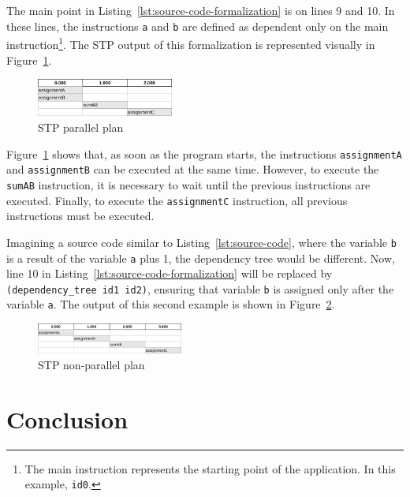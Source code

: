 \documentclass[letterpaper]{article}
\begin{document}
The main point in Listing~\ref{lst:source-code-formalization} is on lines 9 and 10. In these lines, the instructions \texttt{a} and \texttt{b} are defined as dependent only on the main instruction\footnote{The main instruction represents the starting point of the application. In this example, \texttt{id0}.}. The STP output of this formalization is represented visually in Figure~\ref{fig:parallel-plan}.

\begin{figure}[h]
    \centering
    \includegraphics[width=0.4\textwidth]{./images/parallel-tasks-Parallel.png}
    \caption{STP parallel plan}
    \label{fig:parallel-plan}
\end{figure}

Figure~\ref{fig:parallel-plan} shows that, as soon as the program starts, the instructions \texttt{assignmentA} and \texttt{assignmentB} can be executed at the same time. However, to execute the \texttt{sumAB} instruction, it is necessary to wait until the previous instructions are executed. Finally, to execute the \texttt{assignmentC} instruction, all previous instructions must be executed.

Imagining a source code similar to Listing~\ref{lst:source-code}, where the variable \texttt{b} is a result of the variable \texttt{a} plus 1, the dependency tree would be different. Now, line 10 in Listing~\ref{lst:source-code-formalization} will be replaced by \texttt{(dependency\_tree\ id1\ id2)}, ensuring that variable \texttt{b} is assigned only after the variable \texttt{a}. The output of this second example is shown in Figure~\ref{fig:not-parallel-plan}.

\begin{figure}[h]
    \centering
    \includegraphics[width=0.43\textwidth]{./images/parallel-tasks-NotParallel.png}
    \caption{STP non-parallel plan}
    \label{fig:not-parallel-plan}
\end{figure}


\section{Conclusion}
\end{document}
